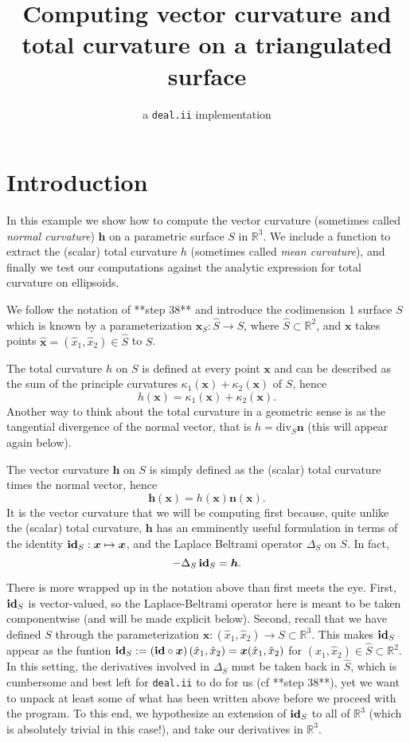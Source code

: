 \documentclass[10pt]{article}
\title{Computing vector curvature and total curvature on a triangulated surface}
\author{a  \texttt{deal.ii} implementation}
\date{ }
\newcommand{\R}{\mathbb{R}}
\newcommand{\mbf}[1]{\boldsymbol{#1}}
\begin{document}
\maketitle


\section*{Introduction}

In this example we show how to compute the vector curvature (sometimes called
\emph{normal curvature}) $\mbf{h}$ on a parametric surface $S$ in $\R^3$.
We include a function to extract the (scalar) total curvature $h$ (sometimes
called \emph{mean curvature}), and finally we test our computations against the
analytic expression for total curvature on ellipsoids.  

We follow the notation of **step 38** and introduce the codimension 1 surface
$S$ which is known by a parameterization $\mbf{x}_{S}: \hat{S} \to S$, where
$\hat{S} \subset \R^2$, and $\mbf{x}$ takes points $\hat{\mbf{x}} =
(\hat{x}_1, \hat{x}_2) \in \hat{S}$ to $S$.

The total curvature $h$ on $S$ is defined at every point
$\mbf{x}$ and can be described as the sum of the principle curvatures
$\kappa_1(\mbf{x}) + \kappa_2(\mbf{x})$ of $S$, hence 
\[h(\mbf{x}) =  \kappa_1(\mbf{x}) + \kappa_2(\mbf{x}).\]
Another way to think about the total curvature in a geometric sense is as the
tangential divergence of the normal vector, that is $h = \text{div}_{S}
\mbf{n}$  (this will appear again below).

The vector curvature $\mbf{h}$ on $S$ is simply defined as the (scalar) total
curvature times the normal vector, hence
\[\mbf{h}(\mbf{x}) = h(\mbf{x})\mbf{n}(\mbf{x}).\]   
It is the vector curvature that we will be computing first because, quite unlike the
(scalar) total curvature, $\mbf{h}$ has an emminently useful formulation in
terms of the identity $\text{\bf id}_S : \mbf{x} \mapsto \mbf{x}$, and the Laplace Beltrami operator $\Delta_S$ on
$S$.  In fact, 
\[ - \Delta_S \, \text{\bf id}_S = \mbf{h}.\]

There is more wrapped up in the notation above than first meets the eye.
First, $\text{\bf id}_S$ is vector-valued, so the Laplace-Beltrami
operator here is meant to be taken componentwise (and will be made explicit
below). Second, recall that we have defined $S$ through the parameterization
$\mbf{x} : (\hat{x}_1, \hat{x}_2) \to S \subset \R^3$.  This makes $\text{\bf
id}_S$ appear as the funtion $\text{\bf id}_S :=  \left( \text{\bf id} \circ
\mbf{x}\right) (\hat{x}_1,\hat{x}_2) = \mbf{x}(\hat{x}_1,\hat{x}_2)$ for
$(\hat{x}_1,\hat{x}_2) \in \hat{S} \subset \R^2$.  In this setting, the
derivatives involved in $\Delta_S$ must be taken back in $\hat{S}$, which is
cumbersome and best left for \texttt{deal.ii} to do for us (cf **step 38**), yet we want to
unpack at least some of what has been written above before we proceed with the
program.  To this end, we hypothesize an extension of $\text{\bf id}_S$ to all
of $\R^3$ (which is absolutely trivial in this case!), and take our derivatives in
$\R^3$. 
\end{document}
